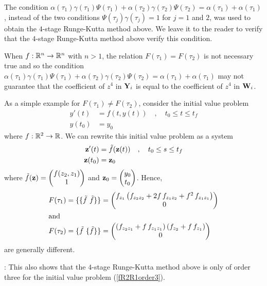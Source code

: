 \begin{rmk}
The condition $\alpha(\tau_1)\gamma(\tau_1)\Psi(\tau_1) +
\alpha(\tau_2)\gamma(\tau_2)\Psi(\tau_2) = \alpha(\tau_1) +
\alpha(\tau_1)$, instead of the two conditions
$\Psi(\tau_j)\gamma(\tau_j) = 1$ for $j=1$ and $2$, was used to
obtain the $4$-stage Runge-Kutta method above.  We leave it to the
reader to verify that the $4$-stage Runge-Kutta method above verify this
condition.

When $f:\mathbb{R}^n \rightarrow \mathbb{R}^n$ with $n>1$, the relation
$F(\tau_1)= F(\tau_2)$ is not necessary true and so the condition
$\alpha(\tau_1)\gamma(\tau_1)\Psi(\tau_1) +
\alpha(\tau_2)\gamma(\tau_2)\Psi(\tau_2) = \alpha(\tau_1) +
\alpha(\tau_1)$ may not guarantee that the coefficient of
$z^4$ in $\mathbf{Y}_i$ is equal to the coefficient of $z^4$
in $\mathbf{W}_i$.

As a simple example for $F(\tau_1) \neq F(\tau_2)$, consider the
initial value problem
\begin{equation} \label{fR2R1order3}
\begin{split}
y'(t) & = f(t,y(t)) \quad , \quad  t_0 \leq t \leq t_f \\
y(t_0) &= y_0
\end{split}
\end{equation}
where $f:\mathbb{R}^2 \rightarrow \mathbb{R}$.   We can rewrite this initial value
problem as a system
\begin{align*}
\mathbf{z}'(t) & = \tilde{f}(\mathbf{z}(t)) \quad , \quad  t_0 \leq s \leq t_f \\
\mathbf{z}(t_0) &= \mathbf{z}_0
\end{align*}
where
$\displaystyle \tilde{f}(\mathbf{z}) = \begin{pmatrix}
f(z_2,z_1) \\ 1 \end{pmatrix}$ and
$\displaystyle \mathbf{z}_0 = \begin{pmatrix}
y_0 \\ t_0 \end{pmatrix}$.
Hence,
\begin{align*}
F(\tau_1) &= \{\{\tilde{f} \ \tilde{f}\}\} =
\begin{pmatrix}
f_{z_1}\left( f_{z_2z_2} + 2f\,f_{z_1z_2} +f^2\,f_{z_1z_1}\right) \\
0
\end{pmatrix} \\
\intertext{and}
F(\tau_2) &= \{\tilde{f}\ \{\tilde{f}\}\} =
\begin{pmatrix}
\left( f_{z_2z_1} + f\,f_{z_1z_1}\right)\left(f_{z_2} +f\,f_{z_1}\right) \\
0
\end{pmatrix}
\end{align*}
are generally different.
\label{NOTiff}

: This also shows that the
$4$-stage Runge-Kutta method above is only of order three for
the initial value problem (\ref{fR2R1order3}).
\end{rmk}

